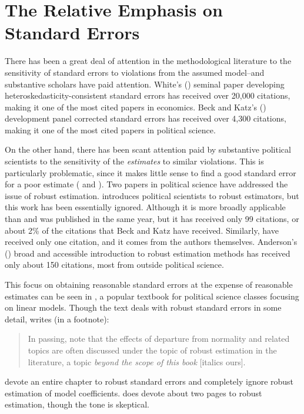 \documentclass[12pt]{article}
\begin{document}
\section*{The Relative Emphasis on Standard Errors}

There has been a great deal of attention in the methodological literature to the sensitivity of standard errors to violations from the assumed model--and substantive scholars have paid attention.
White's (\citeyear{White1980}) seminal paper developing heteroskedasticity-consistent standard errors has received over 20,000 citations, making it one of the most cited papers in economics.
Beck and Katz's (\citeyear{BeckKatz1995}) development panel corrected standard errors has received over 4,300 citations, making it one of the most cited papers in political science.

On the other hand, there has been scant attention paid by substantive political scientists to the sensitivity of the \textit{estimates} to similar violations. 
This is particularly problematic, since it makes little sense to find a good standard error for a poor estimate (\citealt{Freedman2006} and \citealt{KingRoberts2014}). 
Two papers in political science have addressed the issue of robust estimation. 
\cite{Western1995} introduces political scientists to robust estimators, but this work has been essentially ignored. 
Although it is more broadly applicable than \cite{BeckKatz1995} and was published in the same year, but it has received only 99 citations, or  about 2\% of the citations that Beck and Katz have received. 
Similarly, \cite{HardenDesmarais2011} have received only one citation, and it comes from the authors themselves.
Anderson's (\citeyear{Anderson2008}) broad and accessible introduction to robust estimation methods has received only about 150 citations, most from outside political science.

This focus on obtaining reasonable standard errors at the expense of reasonable estimates can be seen in \cite{Gujarati2004}, a popular textbook for political science classes focusing on linear models. 
Though the text deals with robust standard errors in some detail, \cite[p. 339]{Gujarati2004} writes (in a footnote):
\begin{quote}
In passing, note that the effects of departure from normality and related topics are often discussed under the topic of robust estimation in the literature, a topic \textit{beyond the scope of this book} [italics ours].
\end{quote}
\cite{AngristPischke2009} devote an entire chapter to robust standard errors and completely ignore robust estimation of model coefficients. 
\cite{Wooldridge2013} does devote about two pages to robust estimation, though the tone is skeptical.
\end{document}
